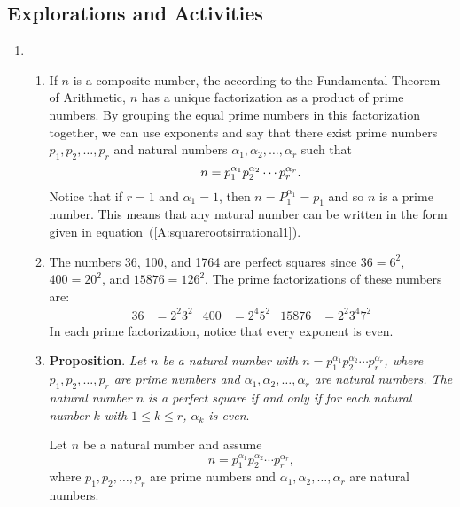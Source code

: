 \subsection*{Explorations and Activities}
\setcounter{oldenumi}{\theenumi}
\begin{enumerate} \setcounter{enumi}{\theoldenumi}
\item \begin{enumerate}
\item If $n$ is a composite number, the according to the Fundamental Theorem of Arithmetic, $n$ has a unique factorization as a product of prime numbers.  By grouping the equal prime numbers in this factorization together, we can use exponents and say that there exist prime numbers 
$p_1, p_2, \ldots, p_r$ and natural numbers 
$\alpha_1, \alpha_2, \ldots, \alpha_r$ such that
\begin{equation}\label{A:squarerootsirrational1}
n = p_1^{\alpha_1} p_2^{\alpha_2} \cdots p_r^{\alpha_r} \notag.
\end{equation} 
Notice that if $r = 1$ and $\alpha_1 = 1$, then $n = P_1^{\alpha_1} = p_1$ and so $n$ is a prime number.  This means that any natural number can be written in the form given in 
equation~(\ref{A:squarerootsirrational1}).


\item  The numbers 36, 100, and 1764 are perfect squares since $36 = 6^2$, $400 = 20^2$, and
$15876 = 126^2$.  The prime factorizations of these numbers are:
\begin{align*}
36 &= 2^2 3^2  &  400 &= 2^4 5^2  &  15876 &= 2^2 3^4 7^2 
\end{align*}
In each prime factorization, notice that every exponent is even.



\item \textbf{Proposition}. \emph{Let $n$ be a natural number with 
$n = p_1^{\alpha_1} p_2^{\alpha_2} \cdots p_r^{\alpha_r}$, where $p_1, p_2, \ldots, p_r$ are prime numbers and $\alpha_1, \alpha_2, \ldots, \alpha_r$ are natural numbers.  The natural number $n$ is a perfect square if and only if for each natural number $k$ with $1 \leq k \leq r$, $\alpha_k$ is even}.

\begin{myproof}
Let $n$ be a natural number and assume 
\begin{equation}\label{nfactor}
n = p_1^{\alpha_1} p_2^{\alpha_2} \cdots p_r^{\alpha_r},
\end{equation} where $p_1, p_2, \ldots, p_r$ are prime numbers and $\alpha_1, \alpha_2, \ldots, \alpha_r$ are natural numbers.


\end{myproof}
\end{enumerate}
\end{enumerate}

